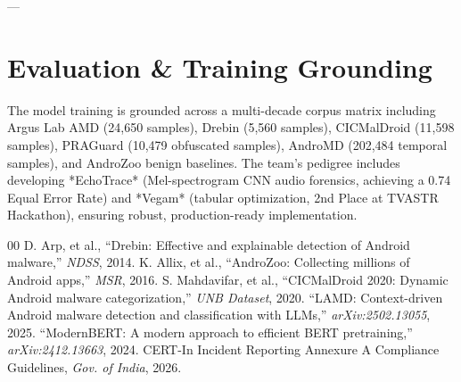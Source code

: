 \documentclass[conference]{IEEEtran}
\begin{document}
---

\section{Evaluation \& Training Grounding}
The model training is grounded across a multi-decade corpus matrix including Argus Lab AMD (24,650 samples), Drebin (5,560 samples), CICMalDroid (11,598 samples), PRAGuard (10,479 obfuscated samples), AndroMD (202,484 temporal samples), and AndroZoo benign baselines. The team's pedigree includes developing *EchoTrace* (Mel-spectrogram CNN audio forensics, achieving a 0.74 Equal Error Rate) and *Vegam* (tabular optimization, 2nd Place at TVASTR Hackathon), ensuring robust, production-ready implementation.

\begin{thebibliography}{00}
 D. Arp, et al., ``Drebin: Effective and explainable detection of Android malware,'' \textit{NDSS}, 2014.
 K. Allix, et al., ``AndroZoo: Collecting millions of Android apps,'' \textit{MSR}, 2016.
 S. Mahdavifar, et al., ``CICMalDroid 2020: Dynamic Android malware categorization,'' \textit{UNB Dataset}, 2020.
 ``LAMD: Context-driven Android malware detection and classification with LLMs,'' \textit{arXiv:2502.13055}, 2025.
 ``ModernBERT: A modern approach to efficient BERT pretraining,'' \textit{arXiv:2412.13663}, 2024.
 CERT-In Incident Reporting Annexure A Compliance Guidelines, \textit{Gov. of India}, 2026.
\end{thebibliography}
\end{document}
